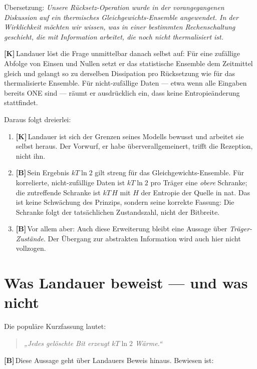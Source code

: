 \documentclass[11pt,a4paper]{article}
\newcommand{\LK}{\textcolor{layK}{\textbf{\footnotesize\textsf{[K]}}}\,}
\newcommand{\LB}{\textcolor{layB}{\textbf{\footnotesize\textsf{[B]}}}\,}
\theoremstyle{ffgft}
\begin{document}
Übersetzung: \emph{Unsere Rücksetz-Operation wurde in der vorangegangenen
Diskussion auf ein thermisches Gleichgewichts-Ensemble angewendet. In der
Wirklichkeit möchten wir wissen, was in einer bestimmten Rechenschaltung
geschieht, die mit Information arbeitet, die noch nicht thermalisiert ist.}

\LK Landauer löst die Frage unmittelbar danach selbst auf: Für eine zufällige
Abfolge von Einsen und Nullen setzt er das statistische Ensemble dem Zeitmittel
gleich und gelangt so zu derselben Dissipation pro Rücksetzung wie für das
thermalisierte Ensemble. Für nicht-zufällige Daten --- etwa wenn alle Eingaben
bereits \textup{ONE} sind --- räumt er ausdrücklich ein, dass keine
Entropieänderung stattfindet.

Daraus folgt dreierlei:

\begin{enumerate}[leftmargin=1.6em,itemsep=0.3em]
  \item \LK Landauer ist sich der Grenzen seines Modells bewusst und arbeitet sie
        selbst heraus. Der Vorwurf, er habe überverallgemeinert, trifft die
        Rezeption, nicht ihn.
  \item \LB Sein Ergebnis $kT\ln 2$ gilt streng für das
        Gleichgewichts-Ensemble. Für korrelierte, nicht-zufällige Daten ist
        $kT\ln 2$ pro Träger eine \emph{obere} Schranke; die zutreffende Schranke
        ist $kT\,H$ mit $H$ der Entropie der Quelle in nat. Das ist keine
        Schwächung des Prinzips, sondern seine korrekte Fassung: Die Schranke
        folgt der tatsächlichen Zustandszahl, nicht der Bitbreite.
  \item \LB Vor allem aber: Auch diese Erweiterung bleibt eine Aussage über
        \emph{Träger-Zustände}. Der Übergang zur abstrakten Information wird auch
        hier nicht vollzogen.
\end{enumerate}

\section{Was Landauer beweist --- und was nicht}

Die populäre Kurzfassung lautet:

\begin{quote}
\emph{„Jedes gelöschte Bit erzeugt $kT\ln 2$ Wärme.“}
\end{quote}

\LB Diese Aussage geht über Landauers Beweis hinaus. Bewiesen ist:
\end{document}
